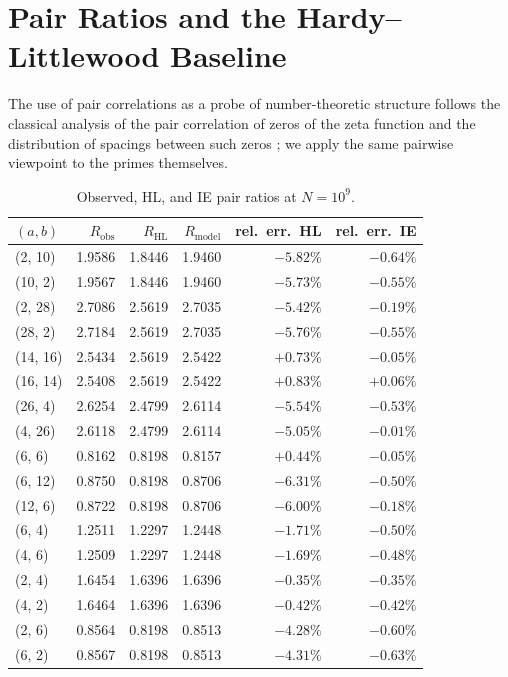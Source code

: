 \documentclass[11pt]{article}
\begin{document}
\section{Pair Ratios and the Hardy--Littlewood Baseline}\label{sec:pair}

The use of pair correlations as a probe of number-theoretic structure
follows the classical analysis of the pair correlation of zeros of
the zeta function \cite{Montgomery1973} and the distribution of
spacings between such zeros \cite{Odlyzko1987}; we apply the same
pairwise viewpoint to the primes themselves.

\begin{table}[H]\centering
\caption{Observed, HL, and IE pair ratios at $N = 10^9$.}
\label{tab:pairs}
\begin{tabular}{lrrrrr}
\toprule
$(a,b)$ & $R_{\mathrm{obs}}$ & $R_{\mathrm{HL}}$ & $R_{\mathrm{model}}$ & rel.\ err.\ HL & rel.\ err.\ IE \\
\midrule
(2, 10) & 1.9586 & 1.8446 & 1.9460 & $-5.82\%$ & $-0.64\%$ \\
(10, 2) & 1.9567 & 1.8446 & 1.9460 & $-5.73\%$ & $-0.55\%$ \\
(2, 28) & 2.7086 & 2.5619 & 2.7035 & $-5.42\%$ & $-0.19\%$ \\
(28, 2) & 2.7184 & 2.5619 & 2.7035 & $-5.76\%$ & $-0.55\%$ \\
(14, 16) & 2.5434 & 2.5619 & 2.5422 & $+0.73\%$ & $-0.05\%$ \\
(16, 14) & 2.5408 & 2.5619 & 2.5422 & $+0.83\%$ & $+0.06\%$ \\
(26, 4) & 2.6254 & 2.4799 & 2.6114 & $-5.54\%$ & $-0.53\%$ \\
(4, 26) & 2.6118 & 2.4799 & 2.6114 & $-5.05\%$ & $-0.01\%$ \\
(6, 6) & 0.8162 & 0.8198 & 0.8157 & $+0.44\%$ & $-0.05\%$ \\
(6, 12) & 0.8750 & 0.8198 & 0.8706 & $-6.31\%$ & $-0.50\%$ \\
(12, 6) & 0.8722 & 0.8198 & 0.8706 & $-6.00\%$ & $-0.18\%$ \\
(6, 4) & 1.2511 & 1.2297 & 1.2448 & $-1.71\%$ & $-0.50\%$ \\
(4, 6) & 1.2509 & 1.2297 & 1.2448 & $-1.69\%$ & $-0.48\%$ \\
(2, 4) & 1.6454 & 1.6396 & 1.6396 & $-0.35\%$ & $-0.35\%$ \\
(4, 2) & 1.6464 & 1.6396 & 1.6396 & $-0.42\%$ & $-0.42\%$ \\
(2, 6) & 0.8564 & 0.8198 & 0.8513 & $-4.28\%$ & $-0.60\%$ \\
(6, 2) & 0.8567 & 0.8198 & 0.8513 & $-4.31\%$ & $-0.63\%$ \\
\bottomrule
\end{tabular}
\end{table}
\end{document}
